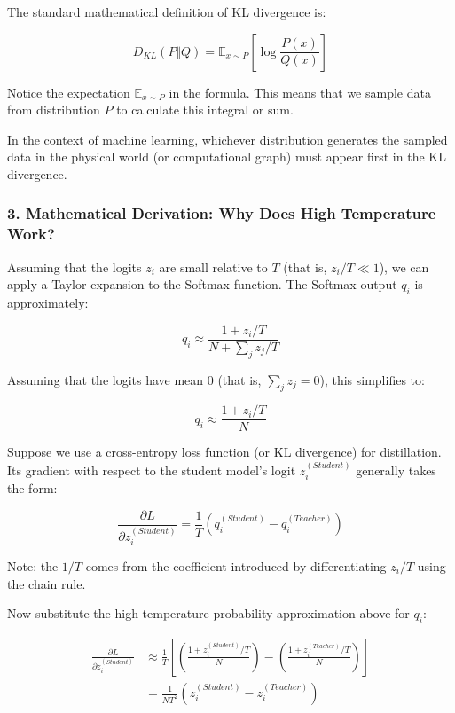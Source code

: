 The standard mathematical definition of KL divergence is:

\[
D_{KL}(P \Vert Q) = \mathbb{E}_{x \sim P}\left[\log \frac{P(x)}{Q(x)}\right]
\]

Notice the expectation \(\mathbb{E}_{x \sim P}\) in the formula. This means that we sample data from distribution \(P\) to calculate this integral or sum.

In the context of machine learning, whichever distribution generates the sampled data in the physical world (or computational graph) must appear first in the KL divergence.

\hypertarget{mathematical-derivation-why-does-high-temperature-work}{%
\subsubsection{3. Mathematical Derivation: Why Does High Temperature Work?}\label{mathematical-derivation-why-does-high-temperature-work}}

Assuming that the logits \(z_i\) are small relative to \(T\) (that is, \(z_i / T \ll 1\)), we can apply a Taylor expansion to the Softmax function. The Softmax output \(q_i\) is approximately:

\[
q_i \approx \frac{1 + z_i / T}{N + \sum_j z_j / T}
\]

Assuming that the logits have mean 0 (that is, \(\sum_j z_j = 0\)), this simplifies to:

\[
q_i \approx \frac{1 + z_i / T}{N}
\]

Suppose we use a cross-entropy loss function (or KL divergence) for distillation. Its gradient with respect to the student model's logit \(z_i^{(Student)}\) generally takes the form:

\[
\frac{\partial L}{\partial z_i^{(Student)}} = \frac{1}{T}\left(q_i^{(Student)} - q_i^{(Teacher)}\right)
\]

Note: the \(1/T\) comes from the coefficient introduced by differentiating \(z_i / T\) using the chain rule.

Now substitute the high-temperature probability approximation above for \(q_i\):

\[
\begin{aligned}
\frac{\partial L}{\partial z_i^{(Student)}} &\approx \frac{1}{T}\left[\left(\frac{1 + z_i^{(Student)} / T}{N}\right) - \left(\frac{1 + z_i^{(Teacher)} / T}{N}\right)\right] \\
&= \frac{1}{NT^2}\left(z_i^{(Student)} - z_i^{(Teacher)}\right)
\end{aligned}
\]

